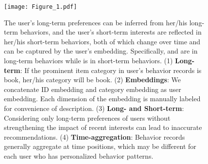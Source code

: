 \documentclass[preprint,12pt]{elsarticle}
\begin{document}
\begin{sloppypar}
\begin{figure}
	\centering
	\texttt{[image: Figure\_1.pdf]}
	\caption{The user's long-term preferences can be inferred from her/his long-term behaviors, and the user's short-term interests are reflected in her/his short-term behaviors, both of which change over time and can be captured by the user's embedding. Specifically,  and  are in long-term behaviors while  is in short-term behaviors. (1) \textbf{Long-term}: If the prominent item category in user's behavior records is book, her/his category will be book. (2) \textbf{Embeddings}: We concatenate ID embedding and category embedding as user embedding. Each dimension of the embedding is manually labeled for convenience of description. (3) \textbf{Long- and Short-term}: Considering only long-term preferences of users without strengthening the impact of recent interests can lead to inaccurate recommendations. (4) \textbf{Time-aggregation}: Behavior records generally aggregate at time positions, which may be different for each user who has personalized behavior patterns.}\label{fig:1}
\end{figure}


\end{sloppypar}
\end{document}
